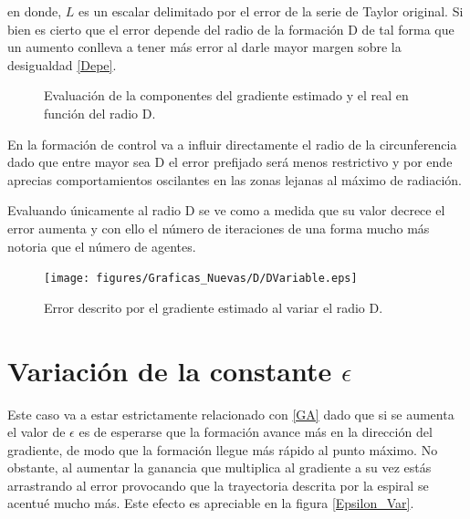 en donde, $L$ es un escalar delimitado por el error de la serie de Taylor original. Si bien es cierto que el error depende del radio de la formación D de tal forma que un aumento conlleva a tener más error al darle mayor margen sobre la desigualdad \ref{Depe}.

\begin{figure}[H]
  \begin{center}
    \caption{Evaluación de la componentes del gradiente estimado y el real en función del radio D.}
    \label{Gradiente_Var_D}
  \end{center}
\end{figure}

En la formación de control va a influir directamente el radio de la circunferencia dado que entre mayor sea D el error prefijado será menos restrictivo y por ende aprecias comportamientos oscilantes en las zonas lejanas al máximo de radiación.

Evaluando únicamente al radio D se ve como a medida que su valor decrece el error aumenta y con ello el número de iteraciones de una forma mucho más notoria que el número de agentes. 

\begin{figure}[H]
\centering
\texttt{[image: figures/Graficas\_Nuevas/D/DVariable.eps]}
\caption{Error descrito por el gradiente estimado al variar el radio D.} \label{D_Var_Error}
\end{figure}

\section{Variación de la constante $\epsilon$}

Este caso va a estar estrictamente relacionado con \ref{GA} dado que si se aumenta el valor de $\epsilon$ es de esperarse que la formación avance más en la dirección del gradiente, de modo que la formación llegue más rápido al punto máximo. No obstante, al aumentar la ganancia que multiplica al gradiente a su vez estás arrastrando al error provocando que la trayectoria descrita por la espiral se acentué mucho más. Este efecto es apreciable en la figura \ref{Epsilon_Var}.

